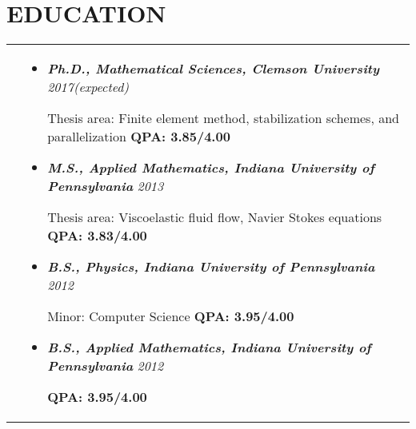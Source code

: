\documentclass[10pt]{article}
\begin{document}
\section{\textbf{EDUCATION}}
\vspace*{-\baselineskip}
\hskip-1.7in
\begin{tabularx}{1.5\linewidth}{>{\raggedleft\scshape}p{3cm}X}
  &\begin{itemize}
    \setlength\itemsep{.005em}
  \item \textbf{\textit{Ph.D., Mathematical Sciences, Clemson University}}  \hspace{37.5 mm} \textit{2017(expected)}
  
             Thesis area: Finite element method, stabilization schemes, and parallelization \textbf{QPA: 3.85/4.00}
             
\item \textbf{\textit{M.S., Applied Mathematics, Indiana University of Pennsylvania}} \hspace{14 mm} \textit{2013}
  
             Thesis area: Viscoelastic fluid flow, Navier Stokes equations \textbf{QPA: 3.83/4.00}
             
\item \textbf{\textit{B.S., Physics, Indiana University of Pennsylvania}} \hspace{40 mm}\textit{2012}
  
             Minor: Computer Science \textbf{QPA: 3.95/4.00}
             
\item \textbf{\textit{B.S., Applied Mathematics, Indiana University of Pennsylvania}} \hspace{16 mm}\textit{2012}
  
             \textbf{QPA: 3.95/4.00} 
  \end{itemize} 

\end{tabularx}
\end{document}
